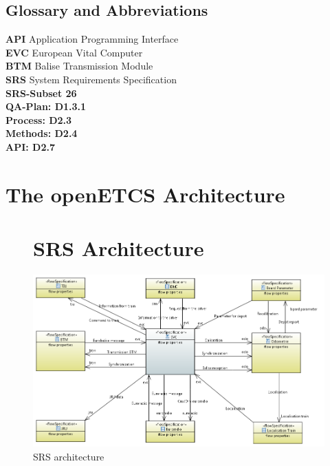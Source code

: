 \documentclass{template/openetcs_report}
\begin{document}
\section{Glossary and Abbreviations}

\textbf{API} Application Programming Interface\\
\textbf{EVC} European Vital Computer\\
\textbf{BTM} Balise Transmission Module\\
\textbf{SRS} System Requirements Specification\\


\textbf{SRS-Subset 26}\\
\textbf{QA-Plan: D1.3.1}\\
\textbf{Process: D2.3}\\
\textbf{Methods: D2.4}\\
\textbf{API: D2.7}\\

\chapter{The openETCS Architecture}


\begin{figure}[hbtp]
\chapter{SRS Architecture}
\centering
\includegraphics[angle=90, scale=0.9] {images/HighLevelArchitecture.png}
\caption{SRS architecture}
\end{figure}
\end{document}
